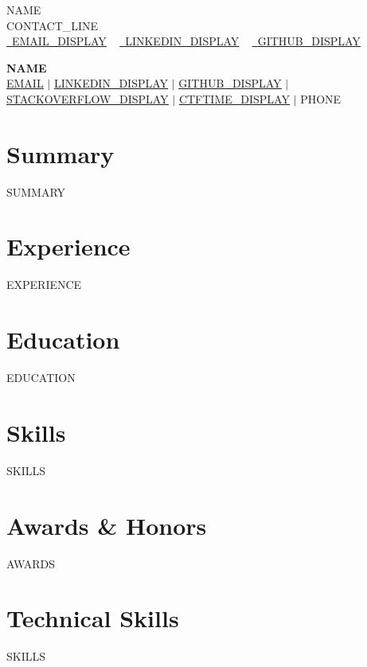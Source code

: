 \documentclass[letterpaper,10pt]{article}
\newcommand{\resumeSubHeadingListStart}{\begin{itemize}[leftmargin=*]}
\newcommand{\resumeSubHeadingListEnd}{\end{itemize}}
\newcommand{\shorterSection}[1]{\vspace{-4pt}\section{#1}}
\begin{document}
    \begin{center}
        {\Huge\scshape {{NAME}}}
        \\ {{CONTACT_LINE}}\\
        \small
        \href{{{EMAIL_URL}}}{\raisebox{-0.2\height}\faEnvelope\  \underline{{{EMAIL_DISPLAY}}}} ~
        \href{{{LINKEDIN_URL}}}{\raisebox{-0.2\height}\faLinkedin\ \underline{{{LINKEDIN_DISPLAY}}}}  ~
        \href{{{GITHUB_URL}}}{\raisebox{-0.2\height}\faGithub\ \underline{{{GITHUB_DISPLAY}}}}
    \end{center}

\begin{center}
  \small \textbf{\huge {{NAME}}}  \\[5pt]
  \href{mailto:{{EMAIL}}}
  { \underline{{{EMAIL}}}}  $\vert$
   \href{{{LINKEDIN_URL}}}{\underline{{{LINKEDIN_DISPLAY}}}} $\vert$
    \href{{{GITHUB_URL}}}{\underline{{{GITHUB_DISPLAY}}}} $\vert$
   \href{{{STACKOVERFLOW_URL}}}{\underline{{{STACKOVERFLOW_DISPLAY}}}} $\vert$
   \href{{{CTFTIME_URL}}}{\underline{{{CTFTIME_DISPLAY}}}} $\vert$
  {{PHONE}}\\
\end{center}

\shorterSection{Summary}
\vspace{2pt}
\small{
{{SUMMARY}}
}
\vspace{2pt}

\shorterSection{Experience}
  \resumeSubHeadingListStart
{{EXPERIENCE}}
  \resumeSubHeadingListEnd

\shorterSection{Education}
  \resumeSubHeadingListStart
{{EDUCATION}}
  \resumeSubHeadingListEnd

\shorterSection{Skills}
  \resumeSubHeadingListStart
  \small
{{SKILLS}}
     \vspace{-5pt}
\resumeSubHeadingListEnd

\section{Awards \& Honors}
\resumeSubHeadingListStart
{{AWARDS}}
\resumeSubHeadingListEnd

\section{Technical Skills}
\vspace{-7pt}
\begin{itemize}
[leftmargin=0.15in, label={}]\small{\item{
{{SKILLS}}
}}
\end{itemize}

\end{document}

